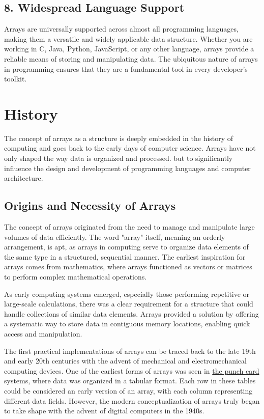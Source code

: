 \documentclass{book}
\begin{document}
\subsection{8. Widespread Language Support}

Arrays are universally supported across almost all programming languages, making them a versatile and widely applicable data structure. Whether you are working in C, Java, Python, JavaScript, or any other language, arrays provide a reliable means of storing and manipulating data. The ubiquitous nature of arrays in programming ensures that they are a fundamental tool in every developer's toolkit.

	\section{History}
	
	The concept of arrays as a structure is deeply embedded in the history of computing and goes back to the early days of computer science. Arrays have not only shaped the way data is organized and processed. but to significantly influence the design and development of programming languages ​​and computer architecture.
	
	\subsection{Origins and Necessity of Arrays}
	
	The concept of arrays originated from the need to manage and manipulate large volumes of data efficiently. The word "array" itself, meaning an orderly arrangement, is apt, as arrays in computing serve to organize data elements of the same type in a structured, sequential manner. The earliest inspiration for arrays comes from mathematics, where arrays functioned as vectors or matrices to perform complex mathematical operations. 
	
	As early computing systems emerged, especially those performing repetitive or large-scale calculations, there was a clear requirement for a structure that could handle collections of similar data elements. Arrays provided a solution by offering a systematic way to store data in contiguous memory locations, enabling quick access and manipulation.
	
	The first practical implementations of arrays can be traced back to the late 19th and early 20th centuries with the advent of mechanical and electromechanical computing devices. One of the earliest forms of arrays was seen in \href{https://en.wikipedia.org/wiki/Punched_card}{the punch card} systems, where data was organized in a tabular format. Each row in these tables could be considered an early version of an array, with each column representing different data fields. However, the modern conceptualization of arrays truly began to take shape with the advent of digital computers in the 1940s.
	
\end{document}
